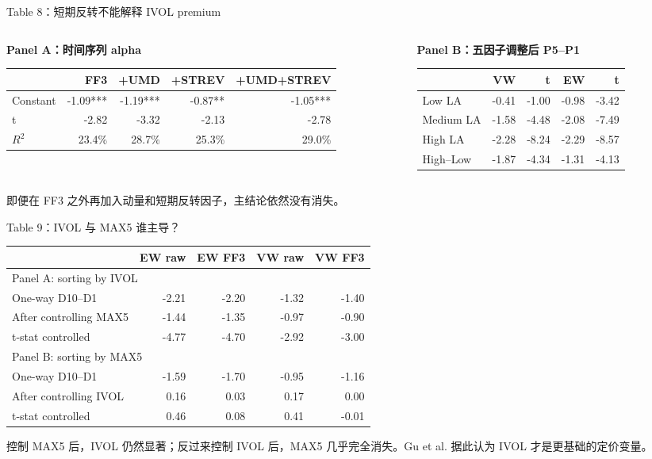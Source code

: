 \documentclass[aspectratio=169,10pt]{beamer}
\newcommand{\tighttable}{\scriptsize\setlength{\tabcolsep}{3pt}\renewcommand{\arraystretch}{1.12}}
\begin{document}
\begin{frame}{Table 8：短期反转不能解释 IVOL premium}
	\begin{columns}[t]
		\begin{column}{0.48\textwidth}
			\textbf{Panel A：时间序列 alpha}
			\scriptsize
			\begin{tabular}{lrrrr}
				\toprule
				& FF3 & +UMD & +STREV & +UMD+STREV\\
				\midrule
				Constant & -1.09*** & -1.19*** & -0.87** & -1.05***\\
				t & -2.82 & -3.32 & -2.13 & -2.78\\
				$R^2$ & 23.4\% & 28.7\% & 25.3\% & 29.0\%\\
				\bottomrule
			\end{tabular}
		\end{column}
		\begin{column}{0.52\textwidth}
			\textbf{Panel B：五因子调整后 P5--P1}
			\scriptsize
			\begin{tabular}{lrrrr}
				\toprule
				& VW & t & EW & t\\
				\midrule
				Low LA & -0.41 & -1.00 & -0.98 & -3.42\\
				Medium LA & -1.58 & -4.48 & -2.08 & -7.49\\
				High LA & -2.28 & -8.24 & -2.29 & -8.57\\
				High--Low & -1.87 & -4.34 & -1.31 & -4.13\\
				\bottomrule
			\end{tabular}
		\end{column}
	\end{columns}
	\par\vspace{5pt}
	\small 即便在 FF3 之外再加入动量和短期反转因子，主结论依然没有消失。
\end{frame}

\begin{frame}{Table 9：IVOL 与 MAX5 谁主导？}
	\tighttable
	\begin{tabular}{lrrrr}
		\toprule
		& EW raw & EW FF3 & VW raw & VW FF3\\
		\midrule
		\multicolumn{5}{l}{Panel A: sorting by IVOL}\\
		One-way D10--D1 & -2.21 & -2.20 & -1.32 & -1.40\\
		After controlling MAX5 & -1.44 & -1.35 & -0.97 & -0.90\\
		t-stat controlled & -4.77 & -4.70 & -2.92 & -3.00\\
		\midrule
		\multicolumn{5}{l}{Panel B: sorting by MAX5}\\
		One-way D10--D1 & -1.59 & -1.70 & -0.95 & -1.16\\
		After controlling IVOL & 0.16 & 0.03 & 0.17 & 0.00\\
		t-stat controlled & 0.46 & 0.08 & 0.41 & -0.01\\
		\bottomrule
	\end{tabular}
	\par\vspace{5pt}
	\small 控制 MAX5 后，IVOL 仍然显著；反过来控制 IVOL 后，MAX5 几乎完全消失。Gu et al. 据此认为 IVOL 才是更基础的定价变量。
\end{frame}
\end{document}
